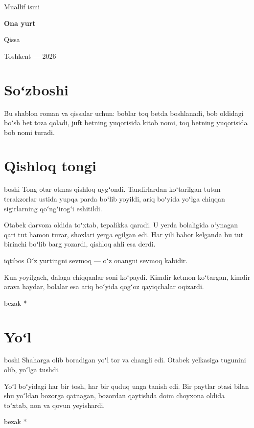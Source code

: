 \documentclass[11pt,twoside,openright]{book}
\begin{document}
\frontmatter
{}
\begin{titlepage}
  \centering
  \vspace*{30mm}
  {\Large Muallif ismi\par}
  \vspace{20mm}
  {\Huge\bfseries Ona yurt\par}
  \vspace{6mm}
  {\large Qissa\par}
  \vfill
  {Toshkent — 2026\par}
\end{titlepage}

\chapter*{Soʻzboshi}
Bu shablon roman va qissalar uchun: boblar toq betda boshlanadi, bob oldidagi
boʻsh bet toza qoladi, juft betning yuqorisida kitob nomi, toq betning
yuqorisida bob nomi turadi.

\mainmatter
{}

\chapter{Qishloq tongi}
\begin{uslub}{boshi}
Tong otar-otmas qishloq uygʻondi. Tandirlardan koʻtarilgan tutun
terakzorlar ustida yupqa parda boʻlib yoyildi, ariq boʻyida yoʻlga
chiqqan sigirlarning qoʻngʻirogʻi eshitildi.
\end{uslub}

Otabek darvoza oldida toʻxtab, tepalikka qaradi. U yerda bolaligida
oʻynagan qari tut hamon turar, shoxlari yerga egilgan edi. Har yili bahor
kelganda bu tut birinchi boʻlib barg yozardi, qishloq ahli esa
 derdi.

\begin{uslub}{iqtibos}
Oʻz yurtingni sevmoq — oʻz onangni sevmoq kabidir.
\end{uslub}

Kun yoyilgach, dalaga chiqqanlar soni koʻpaydi. Kimdir ketmon koʻtargan,
kimdir arava haydar, bolalar esa ariq boʻyida qogʻoz qayiqchalar oqizardi.

\begin{uslub}{bezak}
* \quad * \quad *
\end{uslub}

\chapter{Yoʻl}
\begin{uslub}{boshi}
Shaharga olib boradigan yoʻl tor va changli edi. Otabek yelkasiga
tugunini olib, yoʻlga tushdi.
\end{uslub}

Yoʻl boʻyidagi har bir tosh, har bir quduq unga tanish edi. Bir paytlar
otasi bilan shu yoʻldan bozorga qatnagan, bozordan qaytishda doim
choyxona oldida toʻxtab, non va qovun yeyishardi.

\begin{uslub}{bezak}
* \quad * \quad *
\end{uslub}
\end{document}
